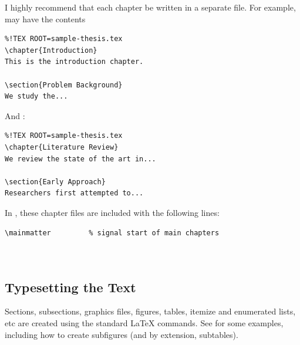 \documentclass[a4paper,nofonts,raggedright,titlepage,openany]{tufte-book}
\begin{document}
I highly recommend that each chapter be written in a separate file. For example,  may have the contents  


\begin{verbatim}
%!TEX ROOT=sample-thesis.tex
\chapter{Introduction}
This is the introduction chapter.

\section{Problem Background}
We study the...
\end{verbatim}

And :
\begin{verbatim}
%!TEX ROOT=sample-thesis.tex
\chapter{Literature Review}
We review the state of the art in...

\section{Early Approach}
Researchers first attempted to...
\end{verbatim}


In , these chapter files are included with the following lines:

\begin{verbatim}
\mainmatter         % signal start of main chapters



\end{verbatim}


\subsection{Typesetting the Text}

Sections, subsections, graphics files, figures, tables, itemize and enumerated lists, etc are created using the standard \LaTeX{} commands. See  for some examples, including how to create subfigures (and by extension, subtables).
\end{document}
